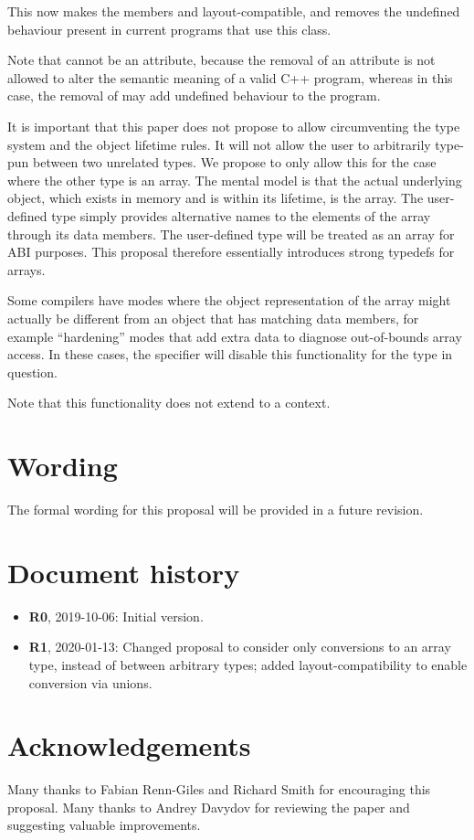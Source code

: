 This now makes the members  and  layout-compatible, and removes the undefined behaviour present in current programs that use this class.

Note that  cannot be an attribute, because the removal of an attribute is not allowed to alter the semantic meaning of a valid C++ program, whereas in this case, the removal of  may add undefined behaviour to the program.

It is important that this paper does not propose to allow circumventing the type system and the object lifetime rules. It will not allow the user to arbitrarily type-pun between two unrelated types. We propose to only allow this for the case where the other type is an array. The mental model is that the actual underlying object, which exists in memory and is within its lifetime, is the array. The user-defined type simply provides alternative names to the elements of the array through its data members. The user-defined type will be treated as an array for ABI purposes. This proposal therefore essentially introduces strong typedefs for arrays.

Some compilers have modes where the object representation of the array might actually be different from an object that has matching data members, for example ``hardening'' modes that add extra data to diagnose out-of-bounds array access. In these cases, the  specifier will disable this functionality for the type in question.

Note that this functionality does not extend to a  context.

\section{Wording}

The formal wording for this proposal will be provided in a future revision.

\section*{Document history}

\begin{itemize}
\item \textbf{R0}, 2019-10-06: Initial version.
\item \textbf{R1}, 2020-01-13: Changed proposal to consider only conversions to an array type, instead of between arbitrary types; added layout-compatibility to enable conversion via unions.
\end{itemize}

\section*{Acknowledgements}

Many thanks to Fabian Renn-Giles and Richard Smith for encouraging this proposal. Many thanks to Andrey Davydov for reviewing the paper and suggesting valuable improvements.

\renewcommand{\bibname}{References}



